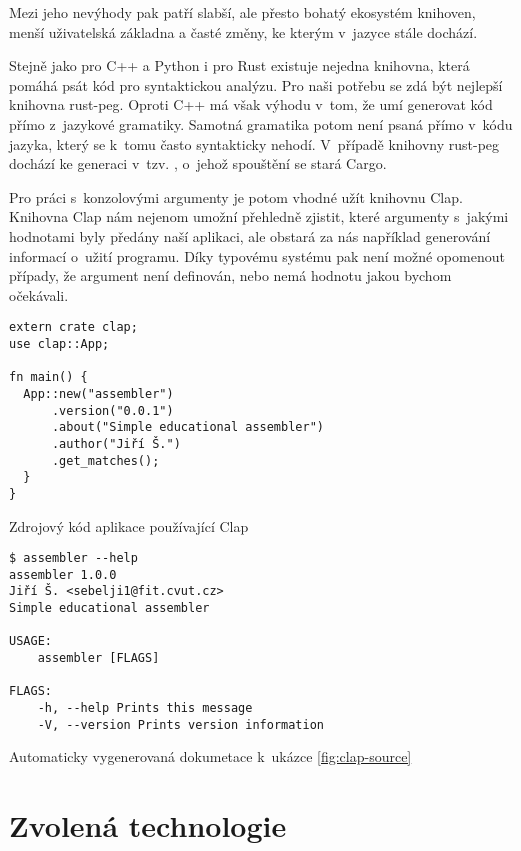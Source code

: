 Mezi jeho nevýhody pak patří slabší, ale přesto bohatý ekosystém knihoven, menší uživatelská základna\cite{so-survey-2018} a časté změny, ke kterým v~jazyce stále dochází.

Stejně jako pro C++ a Python i pro Rust existuje nejedna knihovna, která pomáhá psát kód pro syntaktickou analýzu. Pro naši potřebu se zdá být nejlepší knihovna rust-peg\cite{github-rust-peg}. Oproti C++ má však výhodu v~tom, že umí generovat kód přímo z~jazykové gramatiky. Samotná gramatika potom není psaná přímo v~kódu jazyka, který se k~tomu často syntakticky nehodí. V~případě knihovny rust-peg dochází ke generaci v~tzv. , o~jehož spouštění se stará Cargo.

Pro práci s~konzolovými argumenty je potom vhodné užít knihovnu Clap\cite{github-clap}. Knihovna Clap nám nejenom umožní přehledně zjistit, které argumenty s~ja\-ký\-mi hodnotami byly předány naší aplikaci, ale obstará za nás například generování informací o~užití programu. Díky typovému systému pak není možné opomenout případy, že argument není definován, nebo nemá hodnotu jakou bychom očekávali.

\begin{listing}[htbp]
\begin{verbatim}
extern crate clap;
use clap::App;
 
fn main() {
  App::new("assembler")
      .version("0.0.1")
      .about("Simple educational assembler")
      .author("Jiří Š.")
      .get_matches();
  }
}
\end{verbatim}
\caption{Zdrojový kód aplikace používající Clap}
\label{fig:clap-source}
\end{listing}

\begin{listing}[htbp]
\begin{verbatim}
$ assembler --help
assembler 1.0.0
Jiří Š. <sebelji1@fit.cvut.cz>
Simple educational assembler

USAGE:
    assembler [FLAGS]

FLAGS:
    -h, --help Prints this message
    -V, --version Prints version information
\end{verbatim}
\caption{Automaticky vygenerovaná dokumetace k~ukázce \ref{fig:clap-source}}
\label{fig:clap-output}
\end{listing}

\section{Zvolená technologie}

